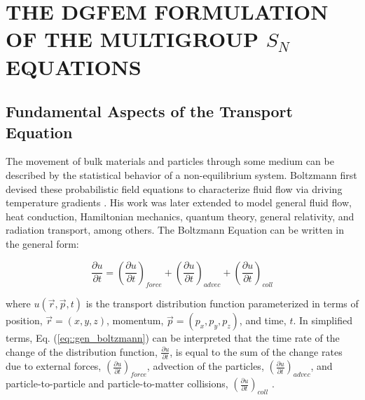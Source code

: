 %
%
%
\chapter{\uppercase {The DGFEM Formulation of the Multigroup $S_N$ Equations}}
\label{sec::Sn}

\section{Fundamental Aspects of the Transport Equation}
\label{sec::DSA_aspects}

The movement of bulk materials and particles through some medium can be described by the statistical behavior of a non-equilibrium system. Boltzmann first devised these probabilistic field equations to characterize fluid flow via driving temperature gradients \cite{encyc_physics}. His work was later extended to model general fluid flow, heat conduction, Hamiltonian mechanics, quantum theory, general relativity, and radiation transport, among others. The Boltzmann Equation can be written in the general form:

\begin{equation}
\label{eq::gen_boltzmann}
\frac{\partial u}{\partial t} = \left( \frac{\partial u}{\partial t}  \right)_{force} + \left( \frac{\partial u}{\partial t}  \right)_{advec} + \left( \frac{\partial u}{\partial t}  \right)_{coll}
\end{equation}

\noindent where $u(\vec{r},\vec{p},t)$ is the transport distribution function parameterized in terms of position, $\vec{r}=(x,y,z)$, momentum, $\vec{p}=(p_x,p_y,p_z)$, and time, $t$. In simplified terms, Eq. (\ref{eq::gen_boltzmann}) can be interpreted that the time rate of the change of the distribution function, $\frac{\partial u}{\partial t}$, is equal to the sum of the change rates due to external forces, $\left( \frac{\partial u}{\partial t}  \right)_{force} $, advection of the particles, $\left( \frac{\partial u}{\partial t}  \right)_{advec}$, and particle-to-particle and particle-to-matter collisions, $\left( \frac{\partial u}{\partial t}  \right)_{coll}$ \cite{mcgraw_physics}. 

